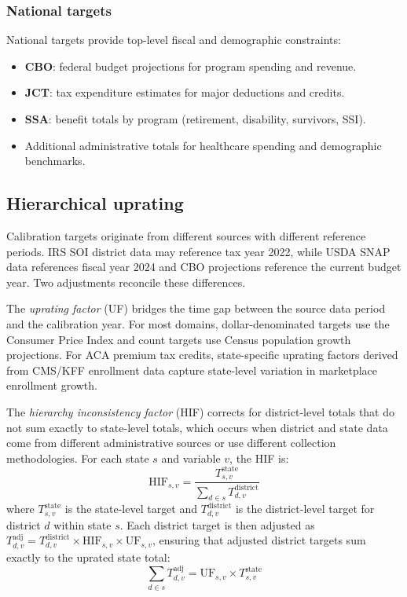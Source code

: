 \subsubsection{National targets}

National targets provide top-level fiscal and demographic constraints:

\begin{itemize}
    \item \textbf{CBO}: federal budget projections for program spending and revenue.
    \item \textbf{JCT}: tax expenditure estimates for major deductions and credits.
    \item \textbf{SSA}: benefit totals by program (retirement, disability, survivors, SSI).
    \item Additional administrative totals for healthcare spending and demographic benchmarks.
\end{itemize}

\subsection{Hierarchical uprating}
\label{sec:uprating}

Calibration targets originate from different sources with different reference periods. IRS SOI district data may reference tax year 2022, while USDA SNAP data references fiscal year 2024 and CBO projections reference the current budget year. Two adjustments reconcile these differences.

The \textit{uprating factor} (UF) bridges the time gap between the source data period and the calibration year. For most domains, dollar-denominated targets use the Consumer Price Index and count targets use Census population growth projections. For ACA premium tax credits, state-specific uprating factors derived from CMS/KFF enrollment data capture state-level variation in marketplace enrollment growth.

The \textit{hierarchy inconsistency factor} (HIF) corrects for district-level totals that do not sum exactly to state-level totals, which occurs when district and state data come from different administrative sources or use different collection methodologies. For each state $s$ and variable $v$, the HIF is:
\begin{equation}
    \text{HIF}_{s,v} = \frac{T_{s,v}^{\text{state}}}{\sum_{d \in s} T_{d,v}^{\text{district}}}
\end{equation}
where $T_{s,v}^{\text{state}}$ is the state-level target and $T_{d,v}^{\text{district}}$ is the district-level target for district $d$ within state $s$. Each district target is then adjusted as $T_{d,v}^{\text{adj}} = T_{d,v}^{\text{district}} \times \text{HIF}_{s,v} \times \text{UF}_{s,v}$, ensuring that adjusted district targets sum exactly to the uprated state total:
\begin{equation}
    \sum_{d \in s} T_{d,v}^{\text{adj}} = \text{UF}_{s,v} \times T_{s,v}^{\text{state}}
\end{equation}

